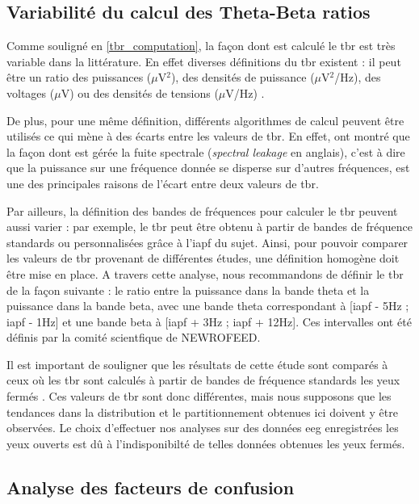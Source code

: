 \subsection{Variabilité du calcul des Theta-Beta ratios} 

Comme souligné en \ref{tbr_computation}, la façon dont est calculé le \gls{tbr} est très variable dans la littérature. En effet diverses définitions du \gls{tbr} existent :
il peut être un ratio des puissances ($\mu$V$^2$), des densités de puissance ($\mu$V$^2$/Hz), des voltages ($\mu$V) ou des densités de tensions ($\mu$V/Hz) 
\citep{Liechti2013}. 

De plus, pour une même définition, différents algorithmes de calcul peuvent être utilisés ce qui mène à des écarts entre les valeurs de \gls{tbr}. En 
effet, \citet{Kerson2019} ont montré que la façon dont est gérée la fuite spectrale (\textit{spectral leakage} en anglais), c'est à dire que la puissance
sur une fréquence donnée se disperse sur d'autres fréquences, est une des principales raisons de l'écart entre deux valeurs de \gls{tbr}. 

Par ailleurs, la définition des bandes de fréquences pour calculer le \gls{tbr} peuvent aussi varier : par exemple, le \gls{tbr} peut être obtenu à partir
de bandes de fréquence standards ou personnalisées grâce à l'\gls{iapf} du sujet. Ainsi, pour pouvoir comparer les valeurs de \gls{tbr} provenant de différentes
études, une définition homogène doit être mise en place. A travers cette analyse, nous recommandons de définir le \gls{tbr} de la façon suivante : 
le ratio entre la puissance dans la bande theta et la puissance dans la bande beta, avec une bande theta correspondant à [\gls{iapf} - 5Hz ; \gls{iapf} - 1Hz]
et une bande beta à [\gls{iapf} + 3Hz ; \gls{iapf} + 12Hz]. Ces intervalles ont été définis par la comité scientfique de NEWROFEED.

Il est important de souligner que les résultats de cette étude sont comparés à ceux où les \gls{tbr} sont calculés à partir de bandes de fréquence standards
les yeux fermés \citep{Zhang2017, Clarke2011}. Ces valeurs de \gls{tbr} sont donc différentes, mais nous supposons que les tendances dans la distribution et le
partitionnement obtenues ici doivent y être observées. Le choix d'effectuer nos analyses sur des données \gls{eeg} enregistrées les yeux ouverts est dû à l'indisponibilté
de telles données obtenues les yeux fermés.

\subsection{Analyse des facteurs de confusion}


